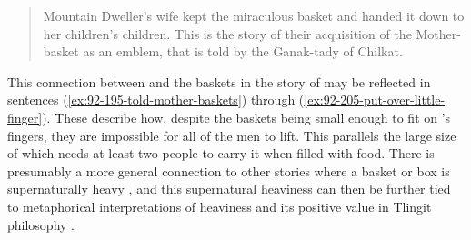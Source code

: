 \begin{quote}\small
Mountain Dweller’s wife kept the miraculous basket and handed it down to her children’s children.
This is the story of their acquisition of the Mother-basket as an emblem, that is told by the Ganak-tady of Chilkat.
\end{quote}

This connection between  and the baskets in the story of  may be reflected in sentences (\ref{ex:92-195-told-mother-baskets}) through (\ref{ex:92-205-put-over-little-finger}).
These describe how, despite the baskets being small enough to fit on ’s fingers, they are impossible for all of the men to lift.
This parallels the large size of  which needs at least two people to carry it when filled with food.
There is presumably a more general connection to other stories where a basket or box is supernaturally heavy \parencites[236]{swanton:1905}[403–404]{swanton:1908}[466, 888]{boas:1916}[465, 514]{boas:2002}, and this supernatural heaviness can then be further tied to metaphorical interpretations of heaviness and its positive value in Tlingit philosophy \parencite[58–61]{kan:2016}.

